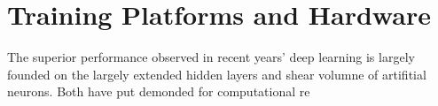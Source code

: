 \section{Training Platforms and Hardware}
The superior performance observed in recent years' deep learning is largely founded on the largely extended hidden layers and shear volumne of artifitial neurons. Both have put demonded for computational re